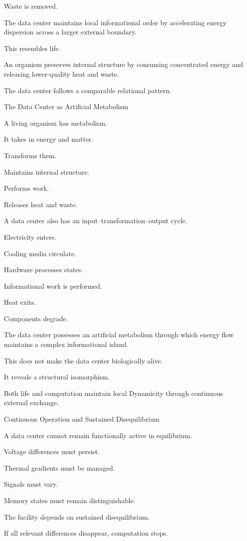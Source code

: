 Waste is removed.

The data center maintains local informational order by accelerating energy dispersion across a larger external boundary.

This resembles life.

An organism preserves internal structure by consuming concentrated energy and releasing lower-quality heat and waste.

The data center follows a comparable relational pattern.

The Data Center as Artificial Metabolism

A living organism has metabolism.

It takes in energy and matter.

Transforms them.

Maintains internal structure.

Performs work.

Releases heat and waste.

A data center also has an input–transformation–output cycle.

Electricity enters.

Cooling media circulate.

Hardware processes states.

Informational work is performed.

Heat exits.

Components degrade.

The data center possesses an artificial metabolism through which energy flow maintains a complex informational island.

This does not make the data center biologically alive.

It reveals a structural isomorphism.

Both life and computation maintain local Dynamicity through continuous external exchange.

Continuous Operation and Sustained Disequilibrium

A data center cannot remain functionally active in equilibrium.

Voltage differences must persist.

Thermal gradients must be managed.

Signals must vary.

Memory states must remain distinguishable.

The facility depends on sustained disequilibrium.

If all relevant differences disappear, computation stops.

